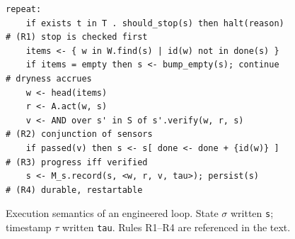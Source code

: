 \documentclass[10pt,twocolumn,letterpaper]{article}
\begin{document}
\begin{figure}[t]
\centering
\begin{minipage}{0.95\textwidth}
\begin{lstlisting}
repeat:
    if exists t in T . should_stop(s) then halt(reason)      # (R1) stop is checked first
    items <- { w in W.find(s) | id(w) not in done(s) }
    if items = empty then s <- bump_empty(s); continue       # dryness accrues
    w <- head(items)
    r <- A.act(w, s)
    v <- AND over s' in S of s'.verify(w, r, s)              # (R2) conjunction of sensors
    if passed(v) then s <- s[ done <- done + {id(w)} ]       # (R3) progress iff verified
    s <- M_s.record(s, <w, r, v, tau>); persist(s)          # (R4) durable, restartable
\end{lstlisting}
\end{minipage}
\caption{Execution semantics of an engineered loop. State $\sigma$ written
\texttt{s}; timestamp $\tau$ written \texttt{tau}. Rules R1--R4 are referenced in
the text.}
\label{fig:rule}
\end{figure}
\end{document}
